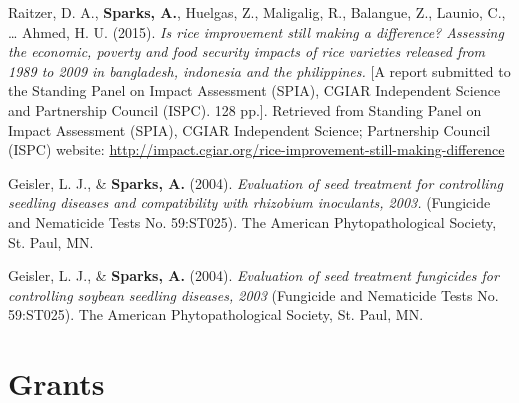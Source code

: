 \documentclass[11pt, a4paper]{awesome-cv}
\begin{document}
\begingroup
\setlength{\parindent}{-0.5in}
\setlength{\leftskip}{0.5in}

\hypertarget{refs_reports}{}
\leavevmode{}%
Raitzer, D. A., \textbf{Sparks, A.}, Huelgas, Z., Maligalig, R.,
Balangue, Z., Launio, C., \ldots{} Ahmed, H. U. (2015). \emph{Is rice
improvement still making a difference? Assessing the economic, poverty
and food security impacts of rice varieties released from 1989 to 2009
in bangladesh, indonesia and the philippines.} {[}A report submitted to
the Standing Panel on Impact Assessment (SPIA), CGIAR Independent
Science and Partnership Council (ISPC). 128 pp.{]}. Retrieved from
Standing Panel on Impact Assessment (SPIA), CGIAR Independent Science;
Partnership Council (ISPC) website:
\url{http://impact.cgiar.org/rice-improvement-still-making-difference}

\leavevmode{}%
Geisler, L. J., \& \textbf{Sparks, A.} (2004). \emph{Evaluation of seed
treatment for controlling seedling diseases and compatibility with
rhizobium inoculants, 2003.} (Fungicide and Nematicide Tests No.
59:ST025). The American Phytopathological Society, St. Paul, MN.

\leavevmode{}%
Geisler, L. J., \& \textbf{Sparks, A.} (2004). \emph{Evaluation of seed
treatment fungicides for controlling soybean seedling diseases, 2003}
(Fungicide and Nematicide Tests No. 59:ST025). The American
Phytopathological Society, St. Paul, MN.

\endgroup

\hypertarget{grants}{%
\section{Grants}\label{grants}}
\end{document}
